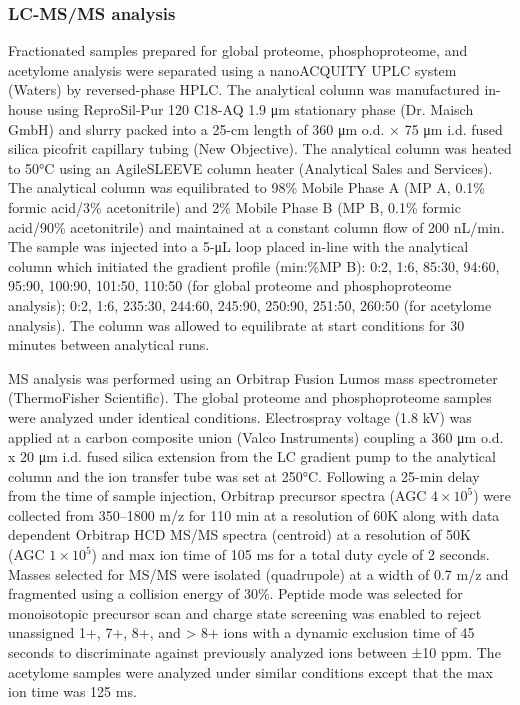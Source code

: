 \subsubsection{LC-MS/MS analysis}
Fractionated samples prepared for global proteome, phosphoproteome, and acetylome analysis were separated using a nanoACQUITY UPLC system (Waters) by reversed-phase HPLC. The analytical column was manufactured in-house using ReproSil-Pur 120 C18-AQ 1.9 μm stationary phase (Dr. Maisch GmbH) and slurry packed into a 25-cm length of 360 μm o.d. × 75 μm i.d. fused silica picofrit capillary tubing (New Objective). The analytical column was heated to 50°C using an AgileSLEEVE column heater (Analytical Sales and Services). The analytical column was equilibrated to 98\% Mobile Phase A (MP A, 0.1\% formic acid/3\% acetonitrile) and 2\% Mobile Phase B (MP B, 0.1\% formic acid/90\% acetonitrile) and maintained at a constant column flow of 200 nL/min. The sample was injected into a 5-μL loop placed in-line with the analytical column which initiated the gradient profile (min:\%MP B): 0:2, 1:6, 85:30, 94:60, 95:90, 100:90, 101:50, 110:50 (for global proteome and phosphoproteome analysis); 0:2, 1:6, 235:30, 244:60, 245:90, 250:90, 251:50, 260:50 (for acetylome analysis). The column was allowed to equilibrate at start conditions for 30 minutes between analytical runs.

MS analysis was performed using an Orbitrap Fusion Lumos mass spectrometer (ThermoFisher Scientific). The global proteome and phosphoproteome samples were analyzed under identical conditions. Electrospray voltage (1.8 kV) was applied at a carbon composite union (Valco Instruments) coupling a 360 μm o.d. x 20 μm i.d. fused silica extension from the LC gradient pump to the analytical column and the ion transfer tube was set at 250°C. Following a 25-min delay from the time of sample injection, Orbitrap precursor spectra (AGC $4 \times 10^5$) were collected from 350--1800 m/z for 110 min at a resolution of 60K along with data dependent Orbitrap HCD MS/MS spectra (centroid) at a resolution of 50K (AGC $1 \times 10^5$) and max ion time of 105 ms for a total duty cycle of 2 seconds. Masses selected for MS/MS were isolated (quadrupole) at a width of 0.7 m/z and fragmented using a collision energy of 30\%. Peptide mode was selected for monoisotopic precursor scan and charge state screening was enabled to reject unassigned 1+, 7+, 8+, and > 8+ ions with a dynamic exclusion time of 45 seconds to discriminate against previously analyzed ions between ±10 ppm. The acetylome samples were analyzed under similar conditions except that the max ion time was 125 ms.


